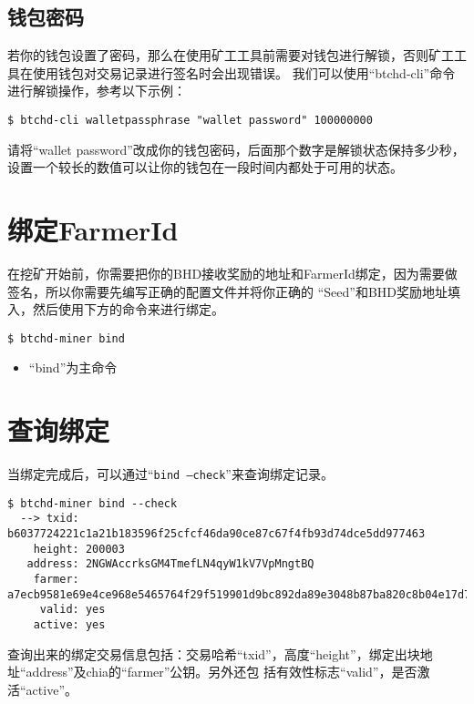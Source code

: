 \subsection{钱包密码}
\begin{flushleft}
    若你的钱包设置了密码，那么在使用矿工工具前需要对钱包进行解锁，否则矿工工具在使用钱包对交易记录进行签名时会出现错误。
    我们可以使用``btchd-cli''命令进行解锁操作，参考以下示例：
\end{flushleft}
\scriptsize
\begin{verbatim}
$ btchd-cli walletpassphrase "wallet password" 100000000
\end{verbatim}
\normalsize
\begin{flushleft}
    请将``wallet password''改成你的钱包密码，后面那个数字是解锁状态保持多少秒，
    设置一个较长的数值可以让你的钱包在一段时间内都处于可用的状态。
\end{flushleft}
\section{绑定FarmerId}
\begin{flushleft}
    在挖矿开始前，你需要把你的BHD接收奖励的地址和FarmerId绑定，因为需要做签名，所以你需要先编写正确的配置文件并将你正确的
    ``Seed''和BHD奖励地址填入，然后使用下方的命令来进行绑定。
\end{flushleft}
\scriptsize
\begin{verbatim}
$ btchd-miner bind
\end{verbatim}
\normalsize
\begin{itemize}
    \item ``bind''为主命令
\end{itemize}
\section{查询绑定}
\begin{flushleft}
    当绑定完成后，可以通过``\texttt{bind --check}''来查询绑定记录。
\end{flushleft}
\scriptsize
\begin{verbatim}
$ btchd-miner bind --check
  --> txid: b6037724221c1a21b183596f25cfcf46da90ce87c67f4fb93d74dce5dd977463
    height: 200003
   address: 2NGWAccrksGM4TmefLN4qyW1kV7VpMngtBQ
    farmer: a7ecb9581e69e4ce968e5465764f29f519901d9bc892da89e3048b87ba820c8b04e17d726bfbb236e3f0e33f8a83851e
     valid: yes
    active: yes
\end{verbatim}
\normalsize
\begin{flushleft}
    查询出来的绑定交易信息包括：交易哈希``txid''，高度``height''，绑定出块地址``address''及chia的``farmer''公钥。另外还包
    括有效性标志``valid''，是否激活``active''。
\end{flushleft}
